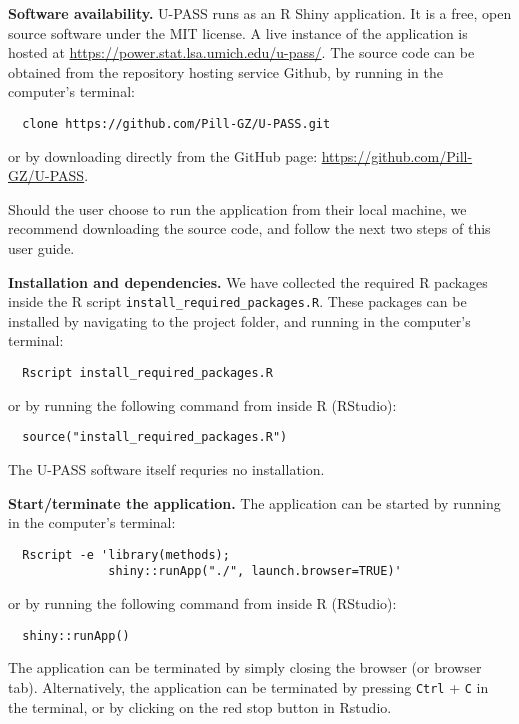 {\bf Software availability.}
U-PASS runs as an R Shiny application. It is a free, open source software under the MIT license.
A live instance of the application is hosted at 
\url{https://power.stat.lsa.umich.edu/u-pass/}.
The source code can be obtained from the repository hosting service Github, by running in the computer's terminal:
\begin{verbatim}
  clone https://github.com/Pill-GZ/U-PASS.git
\end{verbatim}
or by downloading directly from the GitHub page: 
\url{https://github.com/Pill-GZ/U-PASS}.

Should the user choose to run the application from their local machine, we recommend downloading the source code, and follow the next two steps of this user guide.

\bigskip
\noindent
{\bf Installation and dependencies.}
We have collected the required R packages inside the R script
\texttt{install\_required\_packages.R}.
These packages can be installed by navigating to the project folder, and running in the computer's terminal:
\begin{verbatim}
  Rscript install_required_packages.R 
\end{verbatim}
or by running the following command from inside R (RStudio):
\begin{verbatim}
  source("install_required_packages.R")    
\end{verbatim}
The U-PASS software itself requries no installation.

\bigskip
\noindent
{\bf Start/terminate the application.}
The application can be started by running in the computer's terminal:
\begin{verbatim}
  Rscript -e 'library(methods);
              shiny::runApp("./", launch.browser=TRUE)'
\end{verbatim}
or by running the following command from inside R (RStudio):
\begin{verbatim}
  shiny::runApp()
\end{verbatim}
The application can be terminated by simply closing the browser (or browser tab).
Alternatively, the application can be terminated by pressing \texttt{Ctrl} + \texttt{C} in the terminal, or by clicking on the red stop button in Rstudio.
